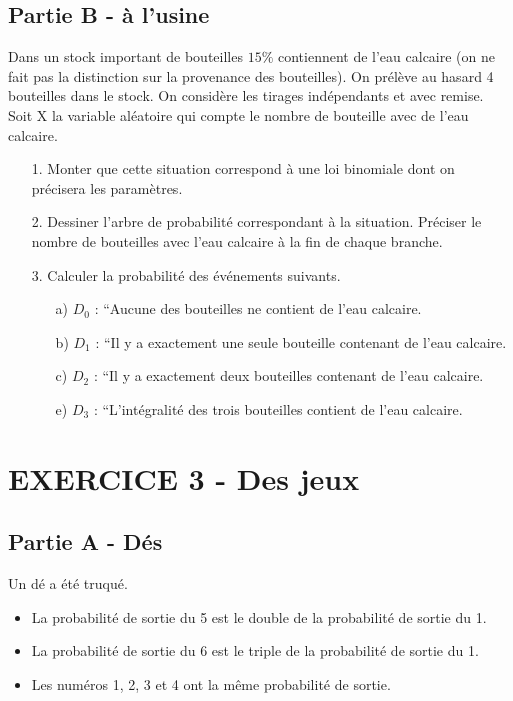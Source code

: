 \documentclass[12pt]{article}
\begin{document}
\subsection*{Partie B - à l'usine}

Dans un stock important de bouteilles $15\%$ contiennent de l'eau calcaire (on ne fait pas la distinction sur la provenance des bouteilles). On prélève au hasard 4 bouteilles dans le stock. On considère les tirages indépendants et avec remise. Soit X la variable aléatoire qui compte le nombre de bouteille avec de l'eau calcaire.

\begin{enumerate}
\item[1.]  Monter que cette situation correspond à une loi binomiale dont on précisera les paramètres.
\item[2.] Dessiner l'arbre de probabilité correspondant à la situation. Préciser le nombre de bouteilles avec l'eau calcaire à la fin de chaque branche.
\item[3.] Calculer la probabilité des événements suivants.
  \begin{enumerate}
  \item[a)] $D_0$ : ``Aucune des bouteilles ne contient de l'eau calcaire.
  \item[b)] $D_1$ : ``Il y a exactement une seule bouteille contenant de l'eau calcaire.
  \item[c)] $D_2$ : ``Il y a exactement deux bouteilles contenant de l'eau calcaire.
  \item[e)] $D_3$ : ``L'intégralité des trois bouteilles contient de l'eau calcaire.
  \end{enumerate}
\end{enumerate}

\newpage
\section*{EXERCICE 3 - Des jeux} %

\subsection*{Partie A - Dés}

Un dé a été truqué.
\begin{itemize}
\item La probabilité de sortie du 5 est le double de la probabilité de sortie du 1. 
\item La probabilité de sortie du 6 est le triple de la probabilité de sortie du 1.
\item Les numéros 1, 2, 3 et 4 ont la même probabilité de sortie.
\end{itemize}
\end{document}
